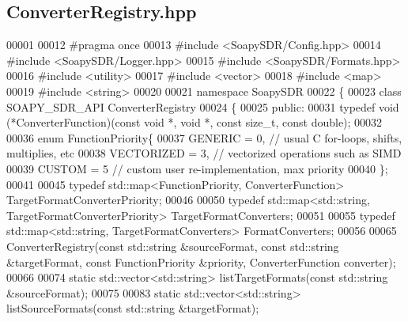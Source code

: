 \subsection{Converter\+Registry.\+hpp}
\label{ConverterRegistry_8hpp_source}

\begin{DoxyCode}
00001 
00012 \textcolor{preprocessor}{#pragma once}
00013 \textcolor{preprocessor}{#include <SoapySDR/Config.hpp>}
00014 \textcolor{preprocessor}{#include <SoapySDR/Logger.hpp>}
00015 \textcolor{preprocessor}{#include <SoapySDR/Formats.hpp>}
00016 \textcolor{preprocessor}{#include <utility>}
00017 \textcolor{preprocessor}{#include <vector>}
00018 \textcolor{preprocessor}{#include <map>}
00019 \textcolor{preprocessor}{#include <string>}
00020 
00021 \textcolor{keyword}{namespace }SoapySDR
00022 \{
00023   \textcolor{keyword}{class }SOAPY_SDR_API ConverterRegistry
00024   \{
00025   \textcolor{keyword}{public}:
00031     \textcolor{keyword}{typedef} void (*ConverterFunction)(\textcolor{keyword}{const} \textcolor{keywordtype}{void} *, \textcolor{keywordtype}{void} *, \textcolor{keyword}{const} size\_t, \textcolor{keyword}{const} double);
00032 
00036     \textcolor{keyword}{enum} FunctionPriority\{
00037       GENERIC = 0,          \textcolor{comment}{// usual C for-loops, shifts, multiplies, etc}
00038       VECTORIZED = 3,       \textcolor{comment}{// vectorized operations such as SIMD}
00039       CUSTOM = 5            \textcolor{comment}{// custom user re-implementation, max priority}
00040     \};
00041 
00045     \textcolor{keyword}{typedef} std::map<FunctionPriority, ConverterFunction> 
      TargetFormatConverterPriority;
00046 
00050     \textcolor{keyword}{typedef} std::map<std::string, TargetFormatConverterPriority> 
      TargetFormatConverters;
00051     
00055     \textcolor{keyword}{typedef} std::map<std::string, TargetFormatConverters> FormatConverters;
00056 
00065     ConverterRegistry(\textcolor{keyword}{const} std::string &sourceFormat, \textcolor{keyword}{const} std::string &targetFormat, \textcolor{keyword}{const} 
      FunctionPriority &priority, ConverterFunction converter);
00066     
00074     \textcolor{keyword}{static} std::vector<std::string> listTargetFormats(\textcolor{keyword}{const} std::string &sourceFormat);
00075     
00083     \textcolor{keyword}{static} std::vector<std::string> listSourceFormats(\textcolor{keyword}{const} std::string &targetFormat);

\end{DoxyCode}
